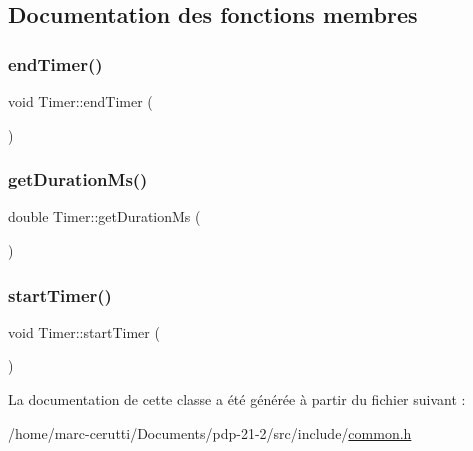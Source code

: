\subsection{Documentation des fonctions membres}
\mbox{\label{class_timer_aef101eede3d1689a55f25f7164ecafcd}} 
\subsubsection{\texorpdfstring{end\+Timer()}{endTimer()}}
{\footnotesize\ttfamily void Timer\+::end\+Timer (\begin{DoxyParamCaption}{ }\end{DoxyParamCaption})\hspace{0.3cm}{\ttfamily [inline]}}

\mbox{\label{class_timer_ae6476c32878861cb4d0a3e650bbe9b6c}} 
\subsubsection{\texorpdfstring{get\+Duration\+Ms()}{getDurationMs()}}
{\footnotesize\ttfamily double Timer\+::get\+Duration\+Ms (\begin{DoxyParamCaption}{ }\end{DoxyParamCaption})\hspace{0.3cm}{\ttfamily [inline]}}

\mbox{\label{class_timer_aa8c887576ec3b0d68c10ebf4097c367c}} 
\subsubsection{\texorpdfstring{start\+Timer()}{startTimer()}}
{\footnotesize\ttfamily void Timer\+::start\+Timer (\begin{DoxyParamCaption}{ }\end{DoxyParamCaption})\hspace{0.3cm}{\ttfamily [inline]}}



La documentation de cette classe a été générée à partir du fichier suivant \+:\begin{DoxyCompactItemize}
\item 
/home/marc-\/cerutti/\+Documents/pdp-\/21-\/2/src/include/\hyperlink{common_8h}{common.\+h}\end{DoxyCompactItemize}
